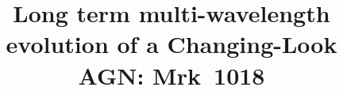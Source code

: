 \documentclass[twocolumn]{aastex63}
\begin{document}
\def\sectionautorefname{Section}
\def\subsectionautorefname{Section}

\title{Long term multi-wavelength evolution of a Changing-Look AGN: Mrk~1018}


\end{document}

